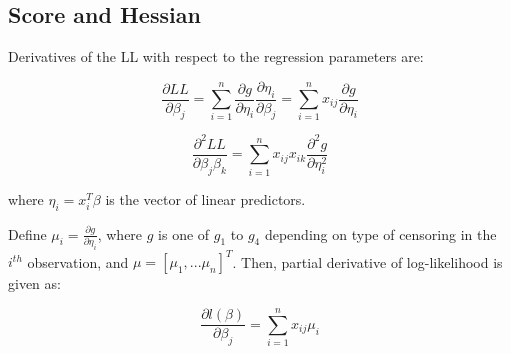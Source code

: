 \documentclass[12pt,a4paper]{report}
\begin{document}
\subsection*{Score and Hessian}

Derivatives of the LL with respect to the regression parameters are:

\begin{equation}
 \frac{\partial LL}{\partial \beta_j} = \sum_{i=1}^n \frac{\partial g}{\partial \eta_i}\frac{\partial \eta_i}{\partial \beta_j} = \sum_{i=1}^n x_{ij} \frac{\partial g}{\partial \eta_i}
\end{equation}

\begin{equation}
 \frac{\partial^2 LL}{\partial \beta_j \beta_k} = \sum_{i=1}^n x_{ij} x_{ik} \frac{\partial^2 g}{\partial \eta_i^2}
\end{equation}

where $\eta_i = x_i^T \beta$ is the vector of linear predictors.






\vspace{5mm}

Define $\mu_i = \frac{\partial g}{\partial \eta_i}$, where $g$ is one of $g_1$ to $g_4$ depending on type of censoring in the $i^{th}$ observation, and $\mu = [\mu_1, ... \mu_n]^T$. Then, partial derivative of log-likelihood is given as:

\begin{equation}
\frac{\partial l(\beta)}{\partial \beta_j} = \sum_{i=1}^n x_{ij} \mu_i
\end{equation}
\end{document}
